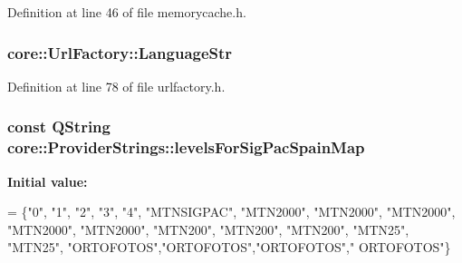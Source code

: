 Definition at line 46 of file memorycache.\-h.

\hypertarget{group___o_p_map_widget_ga5d9399e074794da8ad0593e87e554228}{
\subsubsection[{Language\-Str}]{ core\-::\-Url\-Factory\-::\-Language\-Str\hspace{0.3cm}{\ttfamily [protected]}}}\label{group___o_p_map_widget_ga5d9399e074794da8ad0593e87e554228}


Definition at line 78 of file urlfactory.\-h.

\hypertarget{group___o_p_map_widget_ga8e0c0e07bd5f4a133451306c0603f393}{
\subsubsection[{levels\-For\-Sig\-Pac\-Spain\-Map}]{\setlength{\rightskip}{0pt plus 5cm}const {\bf Q\-String} core\-::\-Provider\-Strings\-::levels\-For\-Sig\-Pac\-Spain\-Map\hspace{0.3cm}{\ttfamily [static]}}}\label{group___o_p_map_widget_ga8e0c0e07bd5f4a133451306c0603f393}
{\bfseries Initial value\-:}
\begin{DoxyCode}
= \{\textcolor{stringliteral}{"0"}, \textcolor{stringliteral}{"1"}, \textcolor{stringliteral}{"2"}, \textcolor{stringliteral}{"3"}, \textcolor{stringliteral}{"4"},
                                                                \textcolor{stringliteral}{"MTNSIGPAC"},
                                                                \textcolor{stringliteral}{"MTN2000"}, \textcolor{stringliteral}{"MTN2000"}, \textcolor{stringliteral}{"MTN2000"}, \textcolor{stringliteral}{"MTN2000"},
       \textcolor{stringliteral}{"MTN2000"},
                                                                \textcolor{stringliteral}{"MTN200"}, \textcolor{stringliteral}{"MTN200"}, \textcolor{stringliteral}{"MTN200"},
                                                                \textcolor{stringliteral}{"MTN25"}, \textcolor{stringliteral}{"MTN25"},
                                                                \textcolor{stringliteral}{"ORTOFOTOS"},\textcolor{stringliteral}{"ORTOFOTOS"},\textcolor{stringliteral}{"ORTOFOTOS"},\textcolor{stringliteral}{"
      ORTOFOTOS"}\}
\end{DoxyCode}


